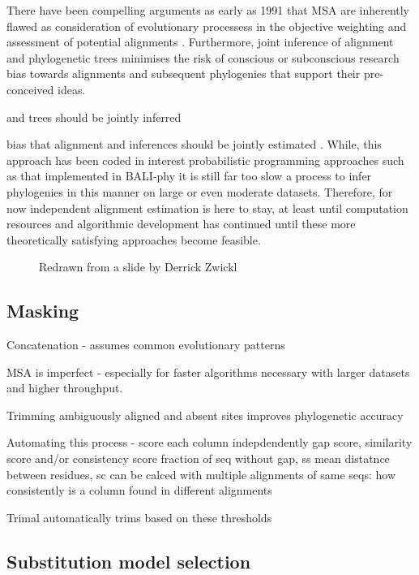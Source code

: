 There have been compelling arguments as early as 1991 that MSA are inherently flawed as consideration of 
evolutionary processess in the objective weighting and assessment of potential alignments \citep{Thorne1991}.
Furthermore, joint inference of alignment and phylogenetic trees minimises the risk
of conscious or subconscious research bias towards alignments and subsequent 
phylogenies that support their pre-conceived ideas.


and trees should be jointly inferred \citep{Thorne1991,Bouchard-Cote2013}

bias that alignment and inferences should be jointly estimated \citep{Redelings2005}.
While, this approach has been coded in interest probabilistic programming approaches
such as that implemented in BALI-phy \citep{Suchard2006} it is still far too
slow a process to infer phylogenies in this manner on large or even moderate datasets.
Therefore, for now independent alignment estimation is here to stay, at least until
computation resources and algorithmic development has continued until these more
theoretically satisfying approaches become feasible.


\begin{figure}
    \caption{Redrawn from a slide by Derrick Zwickl}
\end{figure}

\subsection{Masking}

Concatenation - assumes common evolutionary patterns


MSA is imperfect - especially for faster algorithms necessary with larger datasets
and higher throughput.

Trimming ambiguously aligned and absent sites improves phylogenetic accuracy \citep{Talavera2007}

Automating this process - score each column indepdendently  gap score, similarity score and/or consistency score
fraction of seq without gap, ss mean distatnce between residues, sc can be calced with multiple alignments of same seqs:
how consistently is a column found in different alignments 

Trimal automatically trims based on these thresholds \citep{Capella-Gutierrez2009}

\subsection{Substitution model selection}


